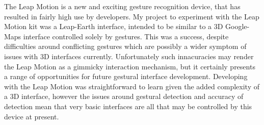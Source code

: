 \documentclass{sigplanconf}
\begin{document}
The Leap Motion is a new and exciting gesture recognition device, that has resulted in fairly high use by developers. My project to experiment with the Leap Motion kit was a Leap-Earth interface, intended to be similar to a 3D Google-Maps interface controlled solely by gestures. This was a success, despite difficulties around conflicting gestures which are possibly a wider symptom of issues with 3D interfaces currently. Unfortunately such innacuracies may render the Leap Motion as a gimmicky interaction mechanism, but it certainly presents a range of opportunities for future gestural interface development. Developing with the Leap Motion was straightforward to learn given the added complexity of a 3D interface, however the issues around gestural detection and accuracy of detection mean that very basic interfaces are all that may be controlled by this device at present. 









\end{document}
